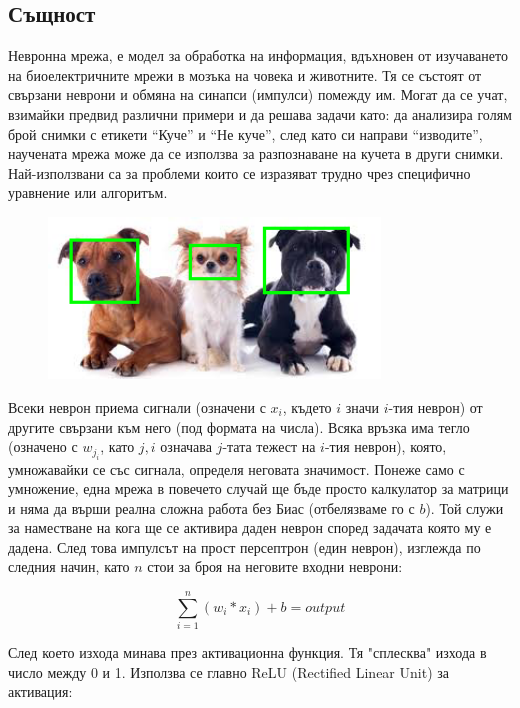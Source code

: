 \subsection{Същност}

Невронна мрежа, е модел за обработка на информация, вдъхновен от изучаването на биоелектричните мрежи в мозъка на човека и животните. Тя се състоят от свързани неврони и обмяна на синапси (импулси) помежду им. Могат да се учат, взимайки предвид различни примери и да решава задачи като: да анализира голям брой снимки с етикети ``Куче'' и ``Не куче'', след като си направи ``изводите'', научената мрежа може да се използва за разпознаване на кучета в други снимки. Най-използвани са за проблеми които се изразяват трудно чрез специфично уравнение или алгоритъм.
\begin{center}
\begin{figure}[h]
    \centering
    \includegraphics[width=250pt]{dogs.png}
\end{figure}
\end{center}
Всеки неврон приема сигнали (означени с $x_i$, където $i$ значи $i$-тия неврон) от другите свързани към него (под формата на числа). Всяка връзка има тегло (означено с $w_j_i$, като $j,i$ означава $j$-тата тежест на $i$-тия неврон), която, умножавайки се със сигнала, определя неговата значимост. Понеже само с умножение, една мрежа в повечето случай ще бъде просто калкулатор за матрици и няма да върши реална сложна работа без Биас (отбелязваме го с $b$). Той служи за наместване на кога ще се активира даден неврон според задачата която му е дадена. След това импулсът на прост персептрон (един неврон), изглежда по следния начин, като $n$ стои за броя на неговите входни неврони:

\begin{center}
\[ \sum_{i=1}^{n} (w_i*x_i) + b = output\]
\end{center} 

След което изхода минава през активационна функция. Тя "сплесква" изхода в число между 0 и 1. Използва се главно ReLU (Rectified Linear Unit) за активация:

